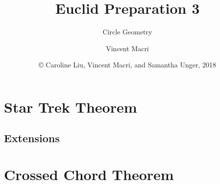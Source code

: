 

\usepackage{adjustbox}
\usepackage{wrapfig}
\usepackage{textpos}
\usepackage{tikz}
\usetikzlibrary{angles,quotes}

\title{Euclid Preparation 3}
\subtitle{Circle Geometry}
\author{Vincent Macri}
\date{\copyright{} Caroline Liu, Vincent Macri, and Samantha Unger, 2018}




	\frame{\titlepage}
	\section{Star Trek Theorem}
		
		\subsection{Extensions}
			
			
			
			
			
	\section{Crossed Chord Theorem}
		


